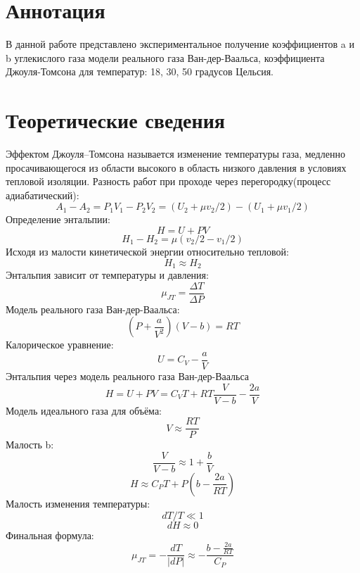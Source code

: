 \documentclass[1 pt]{article}
\begin{document}
\section{Аннотация}
\large В данной работе представлено экспериментальное получение коэффициентов a и b углекислого газа модели реального газа Ван-дер-Ваальса, коэффициента Джоуля-Томсона для температур: 18, 30, 50 градусов Цельсия.
\section{Теоретические сведения}
Эффектом Джоуля–Томсона называется изменение температуры газа, медленно
просачивающегося из области высокого в область низкого давления в условиях тепловой изоляции.
Разность работ при проходе через перегородку(процесс адиабатический):
\begin{equation}
    A_1-A_2 = P_{1}V_{1} - P_{2}V_{2} = (U_2+\mu v_{2}/2) - (U_1+\mu v_{1}/2)
\end{equation}
Определение энтальпии:
\begin{equation}
    H = U + PV
\end{equation}
\begin{equation}
    H_1 - H_2 = \mu (v_{2}/2 - v_{1}/2)
\end{equation}
Исходя из малости кинетической энергии относительно тепловой:
\begin{equation}
    H_1 \approx H_2
\end{equation}
Энтальпия зависит от температуры и давления:
\begin{equation}
    \mu_{JT} = \frac{\Delta T}{\Delta P}
\end{equation}
Модель реального газа Ван-дер-Ваальса:
\begin{equation}
    (P+\frac{a}{V^2})(V-b) = RT
\end{equation}
Калорическое уравнение:
\begin{equation}
    U = C_V-\frac{a}{V}
\end{equation}
Энтальпия через модель реального газа Ван-дер-Ваальса
\begin{equation}
    H = U + PV = C_{V}T + RT \frac{V}{V-b} - \frac{2a}{V}
\end{equation}
Модель идеального газа для объёма:
\begin{equation}
    V \approx \frac{RT}{P}
\end{equation}
Малость b:
\begin{equation}
    \frac{V}{V-b} \approx 1 + \frac{b}{V}
\end{equation}
\begin{equation}
    H \approx C_{P}T+P(b-\frac{2a}{RT})
\end{equation}
Малость изменения температуры:
\begin{equation}
    dT/T \ll 1
\end{equation}
\begin{equation}
    dH \approx 0
\end{equation}
Финальная формула:
\begin{equation}
    \mu_{JT} = - \frac{dT}{|dP|} \approx - \frac{b-\frac{2a}{RT}}{C_P}
\end{equation}
\end{document}
